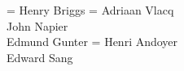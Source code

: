 \documentclass{thesul}
\begin{document}
  
  \ThesisUL
  \President    = {Henry Briggs}
  \Rapporteurs  = {Adriaan Vlacq\\
                   John Napier\\
                   Edmund Gunter}
  \Examinateurs = {Henri Andoyer\\
                   Edward Sang}
  \MakeThesisTitlePage
  
\end{document}
